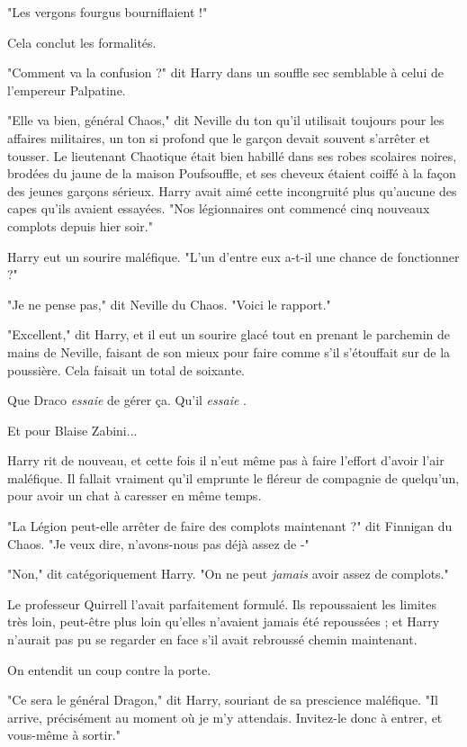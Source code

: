 "Les vergons fourgus bourniflaient !"

Cela conclut les formalités.

"Comment va la confusion ?" dit Harry dans un souffle sec semblable à celui de l'empereur Palpatine.

"Elle va bien, général Chaos," dit Neville du ton qu'il utilisait toujours pour les affaires militaires, un ton si profond que le garçon devait souvent s'arrêter et tousser. Le lieutenant Chaotique était bien habillé dans ses robes scolaires noires, brodées du jaune de la maison Poufsouffle, et ses cheveux étaient coiffé à la façon des jeunes garçons sérieux. Harry avait aimé cette incongruité plus qu'aucune des capes qu'ils avaient essayées. "Nos légionnaires ont commencé cinq nouveaux complots depuis hier soir."

Harry eut un sourire maléfique. "L'un d'entre eux a-t-il une chance de fonctionner ?"

"Je ne pense pas," dit Neville du Chaos. "Voici le rapport."

"Excellent," dit Harry, et il eut un sourire glacé tout en prenant le parchemin de mains de Neville, faisant de son mieux pour faire comme s'il s'étouffait sur de la poussière. Cela faisait un total de soixante.

Que Draco \emph{essaie}  de gérer ça. Qu'il \emph{essaie} .

Et pour Blaise Zabini...

Harry rit de nouveau, et cette fois il n'eut même pas à faire l'effort d'avoir l'air maléfique. Il fallait vraiment qu'il emprunte le fléreur de compagnie de quelqu'un, pour avoir un chat à caresser en même temps.

"La Légion peut-elle arrêter de faire des complots maintenant ?" dit Finnigan du Chaos. "Je veux dire, n'avons-nous pas déjà assez de -"

"Non," dit catégoriquement Harry. "On ne peut \emph{jamais}  avoir assez de complots."

Le professeur Quirrell l'avait parfaitement formulé. Ils repoussaient les limites très loin, peut-être plus loin qu'elles n'avaient jamais été repoussées ; et Harry n'aurait pas pu se regarder en face s'il avait rebroussé chemin maintenant.

On entendit un coup contre la porte.

"Ce sera le général Dragon," dit Harry, souriant de sa prescience maléfique. "Il arrive, précisément au moment où je m'y attendais. Invitez-le donc à entrer, et vous-même à sortir."

